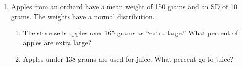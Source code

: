 \documentclass[11pt]{article}
\begin{document}
\begin{enumerate}
\begin{enumerate}[itemsep=1em]
  \work{4em}
  \item more than 33 minutes?

  \work{4em}
  \item from 20 to 28 minutes?

\end{enumerate}
\work{4em}

\item Apples from an orchard have a mean weight of 150 grams and an SD of 10 grams. The weights have a normal distribution.
\begin{enumerate}[itemsep=1em]
  \item The store sells apples over 165 grams as ``extra large.'' What percent of apples are extra large?

  \work{4em}
  \item Apples under 138 grams are used for juice. What percent go to juice?

\end{enumerate}

\end{enumerate}
\end{document}
